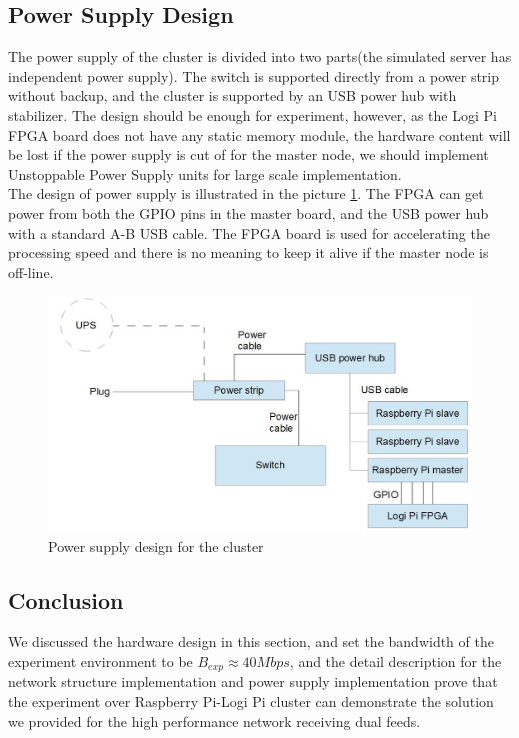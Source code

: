 \documentclass[11pt,openright,a4paper]{report}
\begin{document}
\subsection{Power Supply Design}
The power supply of the cluster is divided into two parts(the simulated server has independent power supply). The switch is supported directly from a power strip without backup, and the cluster is supported by an USB power hub with stabilizer. The design should be enough for experiment, however, as the Logi Pi FPGA board does not have any static memory module, the hardware content will be lost if the power supply is cut of for the master node, we should implement Unstoppable Power Supply units for large scale implementation.\\
The design of power supply is illustrated in the picture \ref{fig:powerDesign}. The FPGA can get power from both the GPIO pins in the master board, and the USB power hub with a standard A-B USB cable. The FPGA board is used for accelerating the processing speed and there is no meaning to keep it alive if the master node is off-line.\\
\begin{figure}[H]
\centering
\includegraphics[width=0.7\linewidth]{picture/powerDesign}
\caption{Power supply design for the cluster}
\label{fig:powerDesign}
\end{figure}
\subsection{Conclusion}
We discussed the hardware design in this section, and set the bandwidth of the experiment environment to be $B_{exp} \approx 40Mbps$, and the detail description for the network structure implementation and power supply implementation prove that the experiment over Raspberry Pi-Logi Pi cluster can demonstrate the solution we provided for the high performance network receiving dual feeds.\\ 
\end{document}
